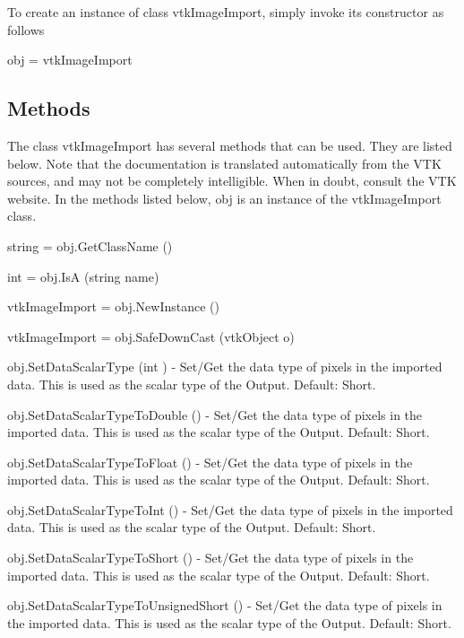 To create an instance of class vtk\-Image\-Import, simply invoke its constructor as follows \begin{DoxyVerb}  obj = vtkImageImport
\end{DoxyVerb}
 \hypertarget{vtkwidgets_vtkxyplotwidget_Methods}{}\subsection{Methods}\label{vtkwidgets_vtkxyplotwidget_Methods}
The class vtk\-Image\-Import has several methods that can be used. They are listed below. Note that the documentation is translated automatically from the V\-T\-K sources, and may not be completely intelligible. When in doubt, consult the V\-T\-K website. In the methods listed below, {\ttfamily obj} is an instance of the vtk\-Image\-Import class. 
\begin{DoxyItemize}
\item {\ttfamily string = obj.\-Get\-Class\-Name ()}  
\item {\ttfamily int = obj.\-Is\-A (string name)}  
\item {\ttfamily vtk\-Image\-Import = obj.\-New\-Instance ()}  
\item {\ttfamily vtk\-Image\-Import = obj.\-Safe\-Down\-Cast (vtk\-Object o)}  
\item {\ttfamily obj.\-Set\-Data\-Scalar\-Type (int )} -\/ Set/\-Get the data type of pixels in the imported data. This is used as the scalar type of the Output. Default\-: Short.  
\item {\ttfamily obj.\-Set\-Data\-Scalar\-Type\-To\-Double ()} -\/ Set/\-Get the data type of pixels in the imported data. This is used as the scalar type of the Output. Default\-: Short.  
\item {\ttfamily obj.\-Set\-Data\-Scalar\-Type\-To\-Float ()} -\/ Set/\-Get the data type of pixels in the imported data. This is used as the scalar type of the Output. Default\-: Short.  
\item {\ttfamily obj.\-Set\-Data\-Scalar\-Type\-To\-Int ()} -\/ Set/\-Get the data type of pixels in the imported data. This is used as the scalar type of the Output. Default\-: Short.  
\item {\ttfamily obj.\-Set\-Data\-Scalar\-Type\-To\-Short ()} -\/ Set/\-Get the data type of pixels in the imported data. This is used as the scalar type of the Output. Default\-: Short.  
\item {\ttfamily obj.\-Set\-Data\-Scalar\-Type\-To\-Unsigned\-Short ()} -\/ Set/\-Get the data type of pixels in the imported data. This is used as the scalar type of the Output. Default\-: Short.  

\end{DoxyItemize}
